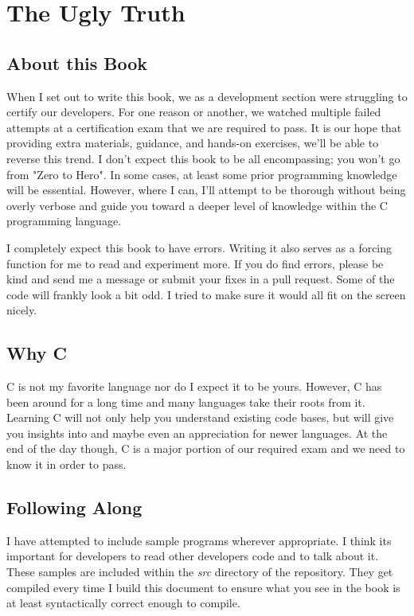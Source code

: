 \documentclass[../main.tex]{subfiles}
\begin{document}
	
\frontmatter
\chapter{The Ugly Truth}
\section{About this Book}
When I set out to write this book, we as a development section were struggling to certify our developers.  For one reason or another, we watched multiple failed attempts at a certification exam that we are required to pass. It is our hope that providing extra materials, guidance, and hands-on exercises, we'll be able to reverse this trend.  I don't expect this book to be all encompassing; you won't go from "Zero to Hero".  In some cases, at least some prior programming knowledge will be essential.  However, where I can, I'll attempt to be thorough without being overly verbose and guide you toward a deeper level of knowledge within the C programming language.

I completely expect this book to have errors.  Writing it also serves as a forcing function for me to read and experiment more.  If you do find errors, please be kind and send me a message or submit your fixes in a pull request.  Some of the code will frankly look a bit odd.  I tried to make sure it would all fit on the screen nicely.

\section{Why C}
C is not my favorite language nor do I expect it to be yours.  However, C has been around for a long time and many languages take their roots from it.  Learning C will not only help you understand existing code bases, but will give you insights into and maybe even an appreciation for newer languages.  At the end of the day though, C is a major portion of our required exam and we need to know it in order to pass.

\section{Following Along}
I have attempted to include sample programs wherever appropriate.  I think its important for developers to read other developers code and to talk about it.  These samples are included within the \textit{src} directory of the repository.  They get compiled every time I build this document to ensure what you see in the book is at least syntactically correct enough to compile.
\end{document}
